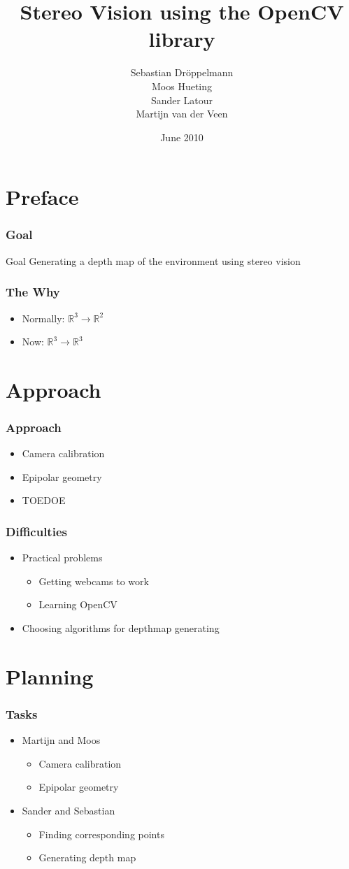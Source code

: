 \documentclass{beamer}
\title[Stereo vision]{Stereo Vision using the OpenCV library}
\author[Dr\"oppelmann \and Hueting \and Latour \and \\Van der Veen]{Sebastian Dr\"oppelmann \\ Moos Hueting \\ Sander Latour \\ Martijn van der Veen}
\institute{University of Amsterdam}
\date{June 2010}
\begin{document}
\frame
{
  \titlepage
}

\section{Preface}

\frame
{
 \frametitle{Goal}
 \begin{block}{Goal}
   Generating a depth map of the environment using stereo vision
 \end{block}
}

\frame
{
  \frametitle{The Why}
  \begin{itemize}
    \item Normally: $\mathbb{R}^3 \rightarrow \mathbb{R}^2$
    \item Now: $\mathbb{R}^3 \rightarrow \mathbb{R}^3$
  \end{itemize}
}

\section{Approach}

\frame
{
  \frametitle{Approach}
  \begin{itemize}
    \item Camera calibration
    \item Epipolar geometry
    \item TOEDOE
  \end{itemize}
}

\frame
{
  \frametitle{Difficulties}
  \begin{itemize}
    \item Practical problems
    \begin{itemize}
      \item Getting webcams to work
      \item Learning OpenCV
    \end{itemize}
    \item Choosing algorithms for depthmap generating
  \end{itemize}
}

\section{Planning}

\frame
{
  \frametitle{Tasks}
  \begin{itemize}
    \item Martijn and Moos
    \begin{itemize}
      \item Camera calibration
      \item Epipolar geometry
    \end{itemize}
    \item Sander and Sebastian
    \begin{itemize}
      \item Finding corresponding points
      \item Generating depth map
    \end{itemize}
  \end{itemize}
}
\end{document}
